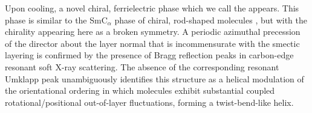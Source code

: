 \documentclass[aagreenthesis]{subfiles}
\begin{document}
Upon cooling, a novel chiral, ferrielectric phase which we call
the  appears.
This phase is similar to the SmC$_\alpha$ phase of chiral, rod-shaped molecules
\cite{mach_structural_1998,mach_structures_1999,hirst2002interlayer,huang2015liquid},
but with the chirality appearing here as a broken symmetry.
A periodic azimuthal precession of the director about the layer normal that is incommensurate with the
smectic layering is confirmed by the presence of Bragg reflection peaks in
carbon-edge resonant soft X-ray scattering. The absence of the corresponding
resonant Umklapp peak unambiguously identifies this structure as a helical
modulation of the orientational ordering in which molecules exhibit substantial coupled
rotational/positional out-of-layer fluctuations, forming a
twist-bend-like helix.
\end{document}
